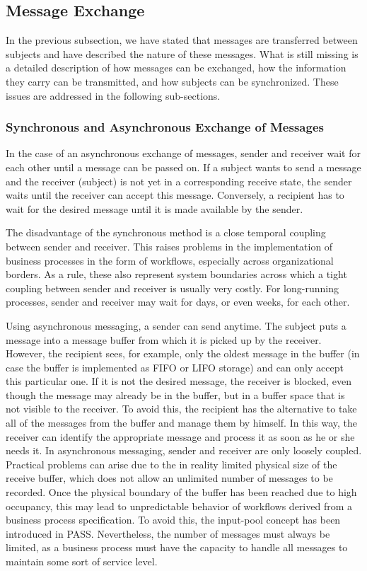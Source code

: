 \subsection{Message Exchange}

In the previous subsection, we have stated that messages are transferred between subjects and have described the nature of these messages. What is still missing is a detailed description of how messages can be exchanged, how the information they carry can be transmitted, and how subjects can be synchronized. These issues are addressed in the following sub-sections.

\subsubsection{Synchronous and Asynchronous Exchange of Messages}

In the case of an asynchronous exchange of messages, sender and receiver wait for each other until a message can be passed on. If a subject wants to send a message and the receiver (subject) is not yet in a corresponding receive state, the sender waits until the receiver can accept this message. Conversely, a recipient has to wait for the desired message until it is made available by the sender.

The disadvantage of the synchronous method is a close temporal coupling between sender and receiver. This raises problems in the implementation of business processes in the form of workflows, especially across organizational borders. As a rule, these also represent system boundaries across which a tight coupling between sender and receiver is usually very costly. For long-running processes, sender and receiver may wait for days, or even weeks, for each other.

Using asynchronous messaging, a sender can send anytime. The subject puts a message into a message buffer from which it is picked up by the receiver. However, the recipient sees, for example, only the oldest message in the buffer (in case the buffer is implemented as FIFO or LIFO storage) and can only accept this particular one. If it is not the desired message, the receiver is blocked, even though the message may already be in the buffer, but in a buffer space that is not visible to the receiver. To avoid this, the recipient has the alternative to take all of the messages from the buffer and manage them by himself. In this way, the receiver can identify the appropriate message and process it as soon as he or she needs it. In asynchronous messaging, sender and receiver are only loosely coupled. Practical problems can arise due to the in reality limited physical size of the receive buffer, which does not allow an unlimited number of messages to be recorded. Once the physical boundary of the buffer has been reached due to high occupancy, this may lead to unpredictable behavior of workflows derived from a business process specification. To avoid this, the input-pool concept has been introduced in PASS. Nevertheless, the number of messages must always be limited, as a business process must have the capacity to handle all messages to maintain some sort of service level.


